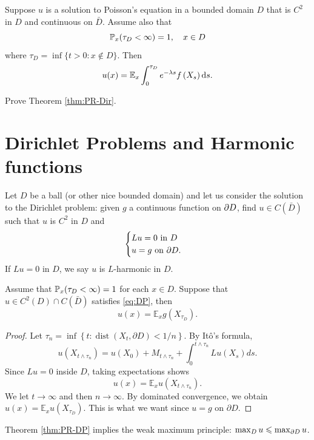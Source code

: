 	\begin{theorem}\label{thm:PR-Dir}
		Suppose $u$ is a solution to Poisson's equation in a bounded domain $D$ that is $C^2$ in $D$ and continuous on $\bar{D}$. Assume also that 
		\begin{equation*}
			{\mathbb P}_x(\tau_D<\infty)=1, \quad x\in D
		\end{equation*}
		where $\tau_D=\inf\{t>0: x\notin D\}$. Then
		\[
		    u(x)=\mathbb{E}_x \int_0^{\tau_D} e^{-\lambda s} f\left(X_s\right) \text{\rm{d}} s.		
		\]
	\end{theorem}
	\begin{exercise}
		Prove Theorem \ref{thm:PR-Dir}. 
	\end{exercise}
	
\section{Dirichlet Problems and Harmonic functions}
Let $D$ be a ball (or other nice bounded domain) and let us consider the solution to the Dirichlet problem: given $g$ a continuous function on $\partial D$, find $u\in C(\bar D)$ such that $u$ is $C^2$ in $D$ and 
\begin{equation}\label{eq:DP}
    \begin{cases}
	Lu=0~\mbox{in}~ D\\
	u=g ~\mbox{on}~\partial D. 
    \end{cases}
\end{equation}
If $Lu=0$ in $D$, we say $u$ is $L$-harmonic in $D$.

\begin{theorem}\label{thm:PR-DP}
    Assume that \({\mathbb P}_x(\tau_D<\infty)=1\) for each \(x\in D\). Suppose that \(u\in C^2(D)\cap C(\bar{D})\) satisfies \eqref{eq:DP}, then 
    $$
    u(x)=\mathbb{E}_x g\left(X_{\tau_D}\right). 
    $$
\end{theorem}
\begin{proof}
    Let $\tau_n=\inf \left\{t: \operatorname{dist}\left(X_t, \partial D\right)<1 / n\right\}$. By Itô's formula,
		$$
		u\left(X_{t \wedge \tau_n}\right)=u\left(X_0\right)+M_{t\wedge \tau_n}+\int_0^{t \wedge \tau_n} L u\left(X_s\right) d s .
		$$
		Since $L u=0$ inside $D$, taking expectations shows
		$$
		u(x)=\mathbb{E}_x u\left(X_{t \wedge \tau_n}\right) .
		$$
		We let $t \rightarrow \infty$ and then $n \rightarrow \infty$. By dominated convergence, we obtain $u(x)=\mathbb{E}_x u\left(X_{\tau_D}\right)$. This is what we want since $u=g$ on $\partial D$.
\end{proof}
	\begin{exercise}
		Theorem \ref{thm:PR-DP} implies the weak maximum principle: $\max_{D} u\leqslant \max_{\partial D} u$. 
	\end{exercise}
	
